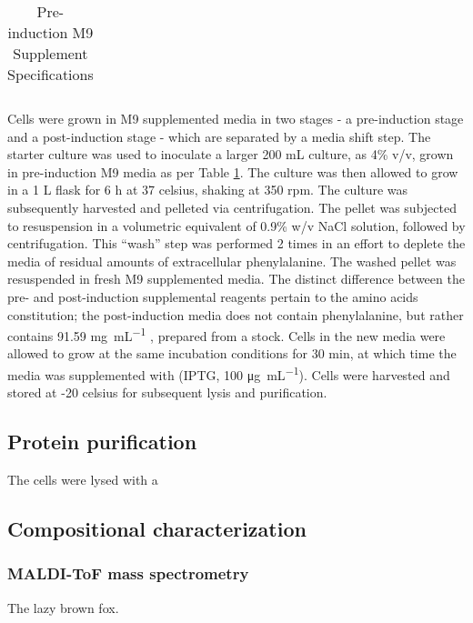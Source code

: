 \begin{refsection}
\begin{table}[h!]
\begin{tabular}{ |l|l| }
  \hline
\end{tabular}
\caption{Pre-induction M9 Supplement Specifications}
\label{tab:preinduction_recipe}
\end{table}

Cells were grown in M9 supplemented media in two stages - a pre-induction stage
and a post-induction stage - which are separated by a media shift step.  The
starter culture was used to inoculate a larger 200 \si{mL} culture, as 4\% v/v,
grown in pre-induction M9 media as per Table \ref{tab:preinduction_recipe}.  The
culture was then allowed to grow in a 1 \si{L} flask for 6 \si{h} at 37
\si{celsius}, shaking at 350 \si{rpm}. The culture was subsequently harvested
and pelleted via centrifugation. The pellet was subjected to resuspension in a
volumetric equivalent of 0.9\% w/v NaCl solution, followed by centrifugation.
This ``wash'' step was performed 2 times in an effort to deplete the media of
residual amounts of extracellular phenylalanine. The washed pellet was
resuspended in fresh M9 supplemented media. The distinct difference between the
pre- and post-induction supplemental reagents pertain to the amino acids
constitution; the post-induction media does not contain phenylalanine, but
rather contains 91.59 \si[inter-unit-product=\ensuremath{{}\cdot{}}]{\mg\per\mL}
, prepared from a stock. Cells in the new media
were allowed to grow at the same incubation conditions for 30 \si{min}, at which
time the media was supplemented with  (IPTG, 100
\si[inter-unit-product=\ensuremath{{}\cdot{}}]{\ug\per\mL}). Cells were
harvested and stored at -20 \si{celsius} for subsequent lysis and purification.

\subsection{Protein purification}

The cells were lysed with a 

\subsection{Compositional characterization}

\subsubsection{MALDI-ToF mass spectrometry}

The lazy brown fox.


\end{refsection}
